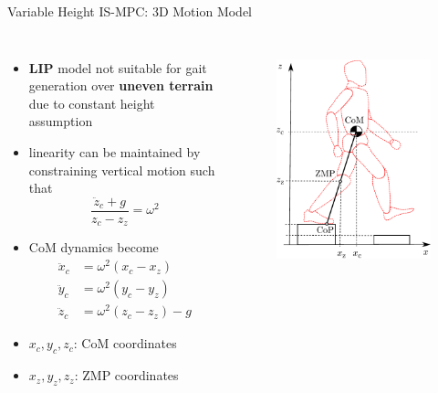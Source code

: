 \documentclass[10pt]{beamer}
\begin{document}
\begin{frame}{Variable Height IS-MPC: 3D Motion Model}
  \begin{columns}[c,onlytextwidth]
      \begin{itemize}
        \item \textbf{LIP} model not suitable for gait generation over
						\textbf{uneven terrain} due to constant height assumption
				\item linearity can be maintained by constraining vertical motion
            such that
			    \begin{equation*}
            \frac{\ddot{z}_c + g}{z_c - z_z} = \omega^2
          \end{equation*}
				\item CoM dynamics become
				  \begin{align*}
					  \ddot{x}_c &= \omega^2 (x_c - x_z)\\
					  \ddot{y}_c &= \omega^2 (y_c - y_z)\\
					  \ddot{z}_c &= \omega^2 (z_c - z_z) - g
				  \end{align*}
        \item $x_c, y_c, z_c$: CoM coordinates
        \item $x_z, y_z, z_z$: ZMP coordinates
			\end{itemize}
		  \begin{figure}
        \centering
        \includegraphics[width=\textwidth]{figures/LIPM_robot.pdf}
        \label{fig:lipm-robot}
    \end{figure}
	\end{columns}
\end{frame}
\end{document}
